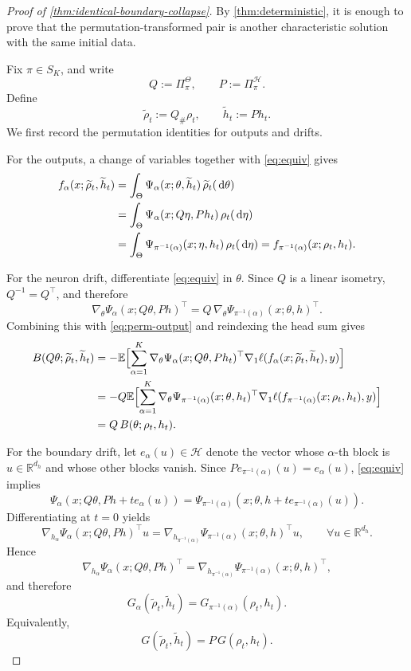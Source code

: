 \documentclass[11pt]{article}
\theoremstyle{definition}
\newcommand{\R}{\mathbb{R}}
\newcommand{\E}{\mathbb{E}}
\newcommand{\dd}{\,\mathrm{d}}
\begin{document}
\begin{proof}[Proof of \cref{thm:identical-boundary-collapse}]
By \cref{thm:deterministic}, it is enough to prove that the permutation-transformed
pair is another characteristic solution with the same initial data.

Fix $\pi\in S_K$, and write
\[
  Q:=\Pi_\pi^\Theta,
  \qquad
  P:=\Pi_\pi^\mathcal H.
\]
Define
\[
  \widetilde\rho_t:=Q_\#\rho_t,
  \qquad
  \widetilde h_t:=P h_t.
\]
We first record the permutation identities for outputs and drifts.

For the outputs, a change of variables together with \eqref{eq:equiv} gives
\begin{align}
  f_\alpha(x;\widetilde\rho_t,\widetilde h_t)
  &=
  \int_\Theta \Psi_\alpha(x;\theta,\widetilde h_t)\,\widetilde\rho_t(\dd\theta)
  \notag\\
  &=
  \int_\Theta \Psi_\alpha(x;Q\eta,P h_t)\,\rho_t(\dd\eta)
  \notag\\
  &=
  \int_\Theta \Psi_{\pi^{-1}(\alpha)}(x;\eta,h_t)\,\rho_t(\dd\eta)
  =
  f_{\pi^{-1}(\alpha)}(x;\rho_t,h_t).
  \label{eq:perm-output}
\end{align}

For the neuron drift, differentiate \eqref{eq:equiv} in $\theta$.
Since $Q$ is a linear isometry, $Q^{-1}=Q^\top$, and therefore
\[
  \nabla_\theta\Psi_\alpha(x;Q\theta,P h)^\top
  =
  Q\,
  \nabla_\theta\Psi_{\pi^{-1}(\alpha)}(x;\theta,h)^\top.
\]
Combining this with \eqref{eq:perm-output} and reindexing the head sum gives
\begin{align}
  B(Q\theta;\widetilde\rho_t,\widetilde h_t)
  &=
  -\E\Bigl[
    \sum_{\alpha=1}^K
    \nabla_\theta\Psi_\alpha(x;Q\theta,P h_t)^\top
    \nabla_1\ell(f_\alpha(x;\widetilde\rho_t,\widetilde h_t),y)
  \Bigr]
  \notag\\
  &=
  -Q\E\Bigl[
    \sum_{\alpha=1}^K
    \nabla_\theta\Psi_{\pi^{-1}(\alpha)}(x;\theta,h_t)^\top
    \nabla_1\ell(f_{\pi^{-1}(\alpha)}(x;\rho_t,h_t),y)
  \Bigr]
  \notag\\
  &=
  Q\,B(\theta;\rho_t,h_t).
  \label{eq:perm-B}
\end{align}

For the boundary drift, let $e_\alpha(u)\in\mathcal H$ denote the vector whose
$\alpha$-th block is $u\in\R^{d_h}$ and whose other blocks vanish. Since
$P e_{\pi^{-1}(\alpha)}(u)=e_\alpha(u)$, \eqref{eq:equiv} implies
\[
  \Psi_\alpha(x;Q\theta,P h+t e_\alpha(u))
  =
  \Psi_{\pi^{-1}(\alpha)}(x;\theta,h+t e_{\pi^{-1}(\alpha)}(u)).
\]
Differentiating at $t=0$ yields
\[
  \nabla_{h_\alpha}\Psi_\alpha(x;Q\theta,P h)^\top u
  =
  \nabla_{h_{\pi^{-1}(\alpha)}}
  \Psi_{\pi^{-1}(\alpha)}(x;\theta,h)^\top u,
  \qquad
  \forall u\in\R^{d_h}.
\]
Hence
\[
  \nabla_{h_\alpha}\Psi_\alpha(x;Q\theta,P h)^\top
  =
  \nabla_{h_{\pi^{-1}(\alpha)}}
  \Psi_{\pi^{-1}(\alpha)}(x;\theta,h)^\top,
\]
and therefore
\[
  G_\alpha(\widetilde\rho_t,\widetilde h_t)
  =
  G_{\pi^{-1}(\alpha)}(\rho_t,h_t).
\]
Equivalently,
\begin{equation}
  G(\widetilde\rho_t,\widetilde h_t)=P\,G(\rho_t,h_t).
  \label{eq:perm-G}
\end{equation}


\end{proof}
\end{document}
